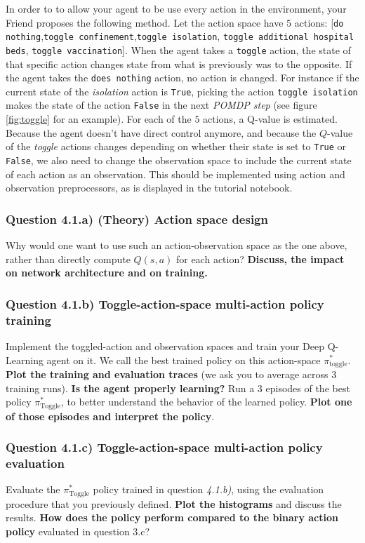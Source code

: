 \documentclass[10pt]{article}
\begin{document}
In order to to allow your agent to be use every action in the environment, your Friend proposes the following method. Let the action space have $5$ actions: [\texttt{do nothing},\texttt{toggle confinement},\texttt{toggle isolation}, \texttt{toggle additional hospital beds}, \texttt{toggle vaccination}]. When the agent takes a \texttt{toggle} action, the state of that specific action changes state from what is previously was to the opposite. If the agent takes the \texttt{does nothing} action, no action is changed.
For instance if the current state of the \textit{isolation} action is \texttt{True}, picking the action \texttt{toggle isolation} makes the state of the action \texttt{False} in the next \textit{POMDP step} (see figure \ref{fig:toggle} for an example). 
For each of the $5$ actions, a Q-value is estimated.
Because the agent doesn't have direct control anymore, and because the $Q$-value of the \textit{toggle} actions changes
depending on whether their state is set to \texttt{True} or \texttt{False}, we also need to change the observation space
to include the current state of each action as an observation. This should be implemented using action and observation preprocessors, as is displayed in the tutorial notebook.

\subsubsection*{Question 4.1.a) (Theory) Action space design}
Why would one want to use such an action-observation space as the one above, rather than directly compute $Q(s,a)$ for each action? \textbf{Discuss, the impact on network architecture and on training.} 
\subsubsection*{Question 4.1.b) Toggle-action-space multi-action policy training}
Implement the toggled-action and observation spaces and train your Deep Q-Learning agent on it. We call the best trained policy on this action-space $\pi^*_\text{toggle}$. \textbf{Plot the training and evaluation traces} (we ask you to average across $3$ training runs). \textbf{Is the agent properly learning?} Run a $3$ episodes of the best policy $\pi^*_\text{Toggle}$, to better understand the behavior of the learned policy.  \textbf{Plot one of those episodes and interpret the policy}.

\subsubsection*{Question 4.1.c) Toggle-action-space multi-action policy evaluation}
Evaluate the $\pi^*_\text{Toggle}$ policy trained in question \textit{4.1.b)}, using the evaluation procedure that you previously defined.
\textbf{Plot the histograms} and discuss the results.
\textbf{How does the policy perform compared to the binary action policy} evaluated in question 3.c?
\end{document}
